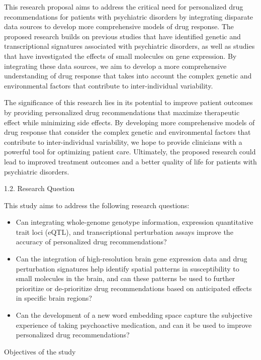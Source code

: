 \documentclass[
]{article}
\providecommand{\tightlist}{%
  \setlength{\itemsep}{0pt}\setlength{\parskip}{0pt}}
\begin{document}
This research proposal aims to address the critical need for
personalized drug recommendations for patients with psychiatric
disorders by integrating disparate data sources to develop more
comprehensive models of drug response. The proposed research builds on
previous studies that have identified genetic and transcriptional
signatures associated with psychiatric disorders, as well as studies
that have investigated the effects of small molecules on gene
expression. By integrating these data sources, we aim to develop a more
comprehensive understanding of drug response that takes into account the
complex genetic and environmental factors that contribute to
inter-individual variability.

The significance of this research lies in its potential to improve
patient outcomes by providing personalized drug recommendations that
maximize therapeutic effect while minimizing side effects. By developing
more comprehensive models of drug response that consider the complex
genetic and environmental factors that contribute to inter-individual
variability, we hope to provide clinicians with a powerful tool for
optimizing patient care. Ultimately, the proposed research could lead to
improved treatment outcomes and a better quality of life for patients
with psychiatric disorders.

1.2. Research Question

This study aims to address the following research questions:

\begin{itemize}
\tightlist
\item
  Can integrating whole-genome genotype information, expression
  quantitative trait loci (eQTL), and transcriptional perturbation
  assays improve the accuracy of personalized drug recommendations?
\item
  Can the integration of high-resolution brain gene expression data and
  drug perturbation signatures help identify spatial patterns in
  susceptibility to small molecules in the brain, and can these patterns
  be used to further prioritize or de-prioritize drug recommendations
  based on anticipated effects in specific brain regions?
\item
  Can the development of a new word embedding space capture the
  subjective experience of taking psychoactive medication, and can it be
  used to improve personalized drug recommendations?
\end{itemize}

Objectives of the study
\end{document}
